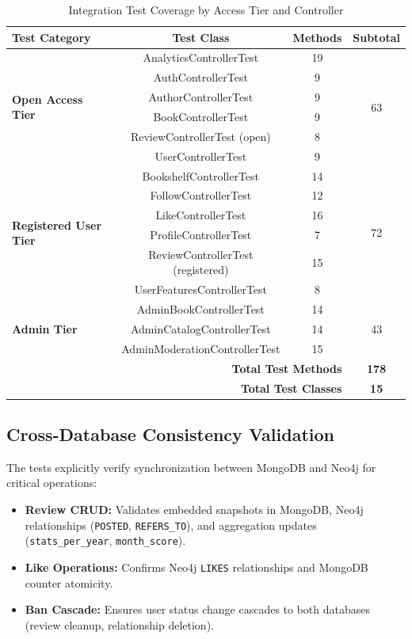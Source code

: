 \begin{table}[H]
    \centering
    \caption{Integration Test Coverage by Access Tier and Controller}
    \label{tab:test_coverage}
    \begin{tabular}{@{}p{}ccc@{}}
        \toprule
        \textbf{Test Category} & \textbf{Test Class} & \textbf{Methods} & \textbf{Subtotal} \\ \midrule
        \multirow{6}{*}{\textbf{Open Access Tier}} 
        & AnalyticsControllerTest & 19 & \multirow{6}{*}{63} \\
        & AuthControllerTest & 9 & \\
        & AuthorControllerTest & 9 & \\
        & BookControllerTest & 9 & \\
        & ReviewControllerTest (open) & 8 & \\
        & UserControllerTest & 9 & \\
        \midrule
        \multirow{6}{*}{\textbf{Registered User Tier}} 
        & BookshelfControllerTest & 14 & \multirow{6}{*}{72} \\
        & FollowControllerTest & 12 & \\
        & LikeControllerTest & 16 & \\
        & ProfileControllerTest & 7 & \\
        & ReviewControllerTest (registered) & 15 & \\
        & UserFeaturesControllerTest & 8 & \\
        \midrule
        \multirow{3}{*}{\textbf{Admin Tier}} 
        & AdminBookControllerTest & 14 & \multirow{3}{*}{43} \\
        & AdminCatalogControllerTest & 14 & \\
        & AdminModerationControllerTest & 15 & \\
        \midrule
        \multicolumn{3}{r}{\textbf{Total Test Methods}} & \textbf{178} \\
        \multicolumn{3}{r}{\textbf{Total Test Classes}} & \textbf{15} \\
        \bottomrule
    \end{tabular}
\end{table}

\subsection{Cross-Database Consistency Validation}
The tests explicitly verify synchronization between MongoDB and Neo4j for critical operations:
\begin{itemize}
    \item \textbf{Review CRUD:} Validates embedded snapshots in MongoDB, Neo4j relationships (\texttt{POSTED}, \texttt{REFERS\_TO}), and aggregation updates (\texttt{stats\_per\_year}, \texttt{month\_score}).
    \item \textbf{Like Operations:} Confirms Neo4j \texttt{LIKES} relationships and MongoDB counter atomicity.
    \item \textbf{Ban Cascade:} Ensures user status change cascades to both databases (review cleanup, relationship deletion).
\end{itemize}

